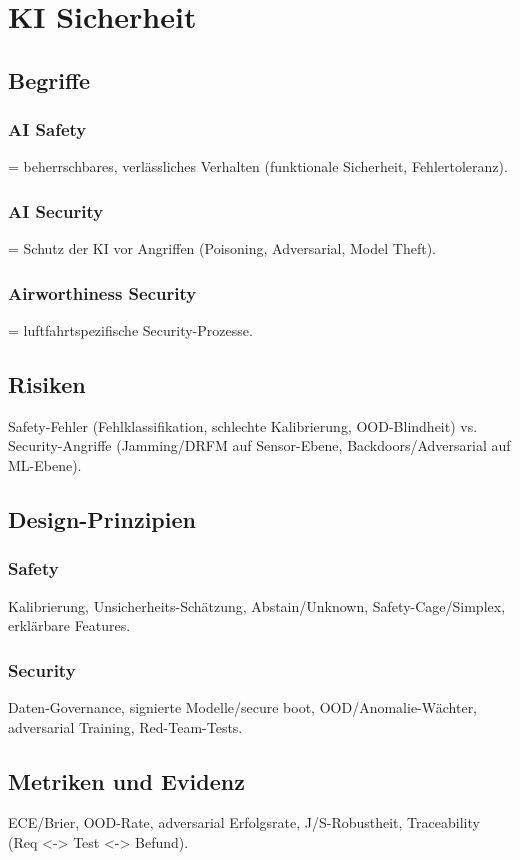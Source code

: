 \part{KI Sicherheit}
\chapter{Begriffe} 

\section{AI Safety}
= beherrschbares, verlässliches Verhalten (funktionale Sicherheit, Fehlertoleranz).

\section{AI Security}
= Schutz der KI vor Angriffen (Poisoning, Adversarial, Model Theft).

\section{Airworthiness Security}
= luftfahrtspezifische Security-Prozesse.




\chapter{Risiken}
Safety-Fehler (Fehlklassifikation, schlechte Kalibrierung, OOD-Blindheit) 
vs. Security-Angriffe (Jamming/DRFM auf Sensor-Ebene, Backdoors/Adversarial auf ML-Ebene).

\chapter{Design-Prinzipien}
\section{Safety}
Kalibrierung, Unsicherheits-Schätzung, Abstain/Unknown, Safety-Cage/Simplex, erklärbare Features.

\section{Security}
Daten-Governance, signierte Modelle/secure boot, OOD/Anomalie-Wächter, adversarial Training, Red-Team-Tests.

\chapter{Metriken und Evidenz}
ECE/Brier, OOD-Rate, adversarial Erfolgsrate, J/S-Robustheit, Traceability (Req <-> Test <-> Befund).